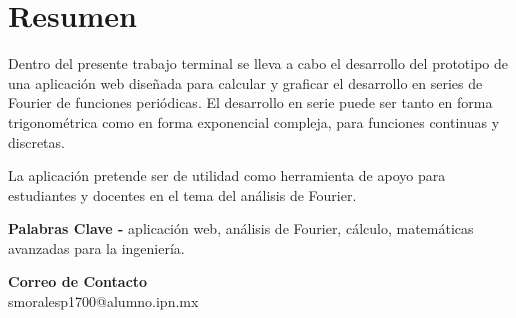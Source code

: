 \chapter{Resumen}


Dentro del presente trabajo terminal se lleva a cabo el desarrollo del prototipo de una aplicación web diseñada para calcular y graficar el desarrollo en series de Fourier de funciones periódicas. El desarrollo en serie puede ser tanto en forma trigonométrica como en forma exponencial compleja, para funciones continuas y discretas. 


 La aplicación pretende ser de utilidad como herramienta de apoyo para estudiantes y docentes en el tema del análisis de Fourier.

\vspace{0.5cm}

\textbf{Palabras Clave -} aplicación web, análisis de Fourier, cálculo, matemáticas avanzadas para la ingeniería.

\vspace{0.5cm}

\textbf{Correo de Contacto} \\
smoralesp1700@alumno.ipn.mx \\